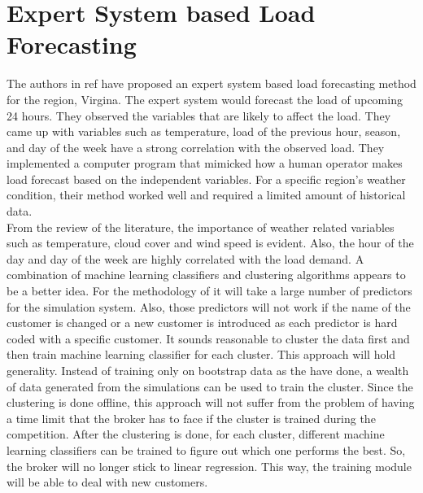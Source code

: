 \section{Expert System based Load Forecasting}
The authors in ref \cite{rahman1988expert} have proposed an expert system based load forecasting method for the region, Virgina. The expert system would forecast the load of upcoming 24 hours. They observed the variables that are likely to affect the load. They came up with variables such as temperature, load of the previous hour, season, and day of the week have a strong correlation with the observed load. They implemented a computer program that mimicked how a human operator makes load forecast based on the independent variables. For a specific region's weather condition, their method worked well and required a limited amount of historical data.  \\

From the review of the literature, the importance of weather related variables such as temperature, cloud cover and wind speed is evident. Also, the hour of the day and day of the week are highly correlated with the load demand. A combination of machine learning classifiers and clustering algorithms appears to be a better idea. For the methodology of \cite{parra2013initial} it will take a large number of predictors for the simulation system. Also, those predictors will not work if the name of the customer is changed or a new customer is introduced as each predictor is hard coded with a specific customer. It sounds reasonable to cluster the data first and then train machine learning classifier for each cluster. This approach will hold generality. Instead of training only on bootstrap data as the \cite{wang2015gongbroker} have done, a wealth of data generated from the simulations can be used to  train the cluster. Since the clustering is done offline, this approach will not  suffer from the problem of having a time limit that the broker has to face if the cluster is trained during the competition. After the clustering is done, for each cluster, different machine learning classifiers can be trained to figure out which one performs the best. So, the broker will no longer stick to linear regression. This way, the training module will be able to deal with new customers.

